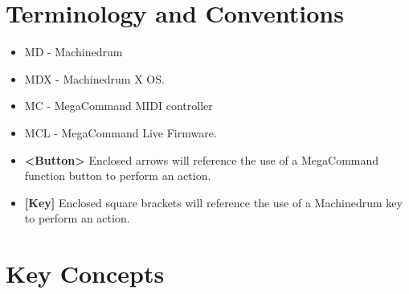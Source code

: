 \chapter{Terminology and Conventions}
   \begin{itemize}
      \item MD - Machinedrum
      \item MDX - Machinedrum X OS.
      \item MC - MegaCommand MIDI controller
      \item MCL - MegaCommand Live Firmware.
      \item \textbf{<Button> } Enclosed arrows will reference the use of a MegaCommand function button to perform an action.
      \item \textbf{[Key] } Enclosed square brackets will reference the use of a Machinedrum key to perform an action.

      
   \end{itemize}
   
\newpage
\chapter{Key Concepts}

